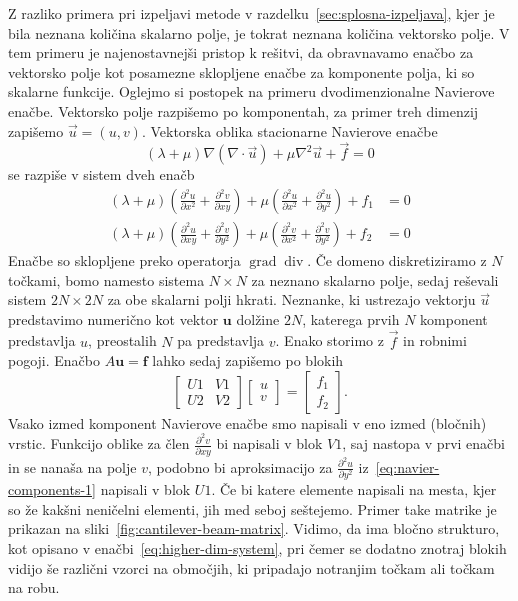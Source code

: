 \documentclass[12pt,a4paper,twoside]{article}
\theoremstyle{definition} %
\theoremstyle{plain} %
\numberwithin{equation}{section}
\renewcommand{\div}{\operatorname{div}}
\newcommand{\grad}{\operatorname{grad}}
\renewcommand{\b}{\boldsymbol}
\newcommand{\dpar}[2]{\ensuremath{\frac{\partial #1}{\partial #2}}}
\newcommand{\vu}{\vec{u}}
\newcommand{\vf}{\vec{f}}
\begin{document}
Z razliko primera pri izpeljavi metode v razdelku~\ref{sec:splosna-izpeljava}, kjer je bila neznana
količina skalarno polje, je tokrat neznana količina vektorsko polje. V tem primeru je
najenostavnejši pristop k rešitvi, da obravnavamo enačbo za vektorsko polje kot posamezne sklopljene
enačbe za komponente polja, ki so skalarne funkcije. Oglejmo si postopek na primeru dvodimenzionalne
Navierove enačbe. Vektorsko polje razpišemo po komponentah, za primer treh dimenzij zapišemo $\vu =
(u, v)$. Vektorska oblika stacionarne Navierove enačbe
\begin{equation}
  (\lambda+\mu)\nabla(\nabla\cdot \vu) + \mu\nabla^2 \vu + \vf = 0
\end{equation}
se razpiše v sistem dveh enačb
\begin{align}
  \label{eq:navier-components-1}
(\lambda +\mu ) \left(\dpar{^2u}{x^2}+\dpar{^2v}{xy}\right)+\mu  \left(\dpar{^2u}{x^2}+\dpar{^2u}{y^2}\right)+f_1&=0 \\
(\lambda +\mu ) \left(\dpar{^2u}{xy}+\dpar{^2v}{y^2}\right)+\mu  \left(\dpar{^2v}{x^2}+\dpar{^2v}{y^2}\right)+f_2&=0
\end{align}
Enačbe so sklopljene preko operatorja $\grad\div$. Če domeno diskretiziramo z $N$ točkami, bomo
namesto sistema $N\times N$ za neznano skalarno polje, sedaj reševali sistem $2N\times 2N$ za
obe skalarni polji hkrati. Neznanke, ki ustrezajo vektorju $\vu$ predstavimo numerično kot vektor
$\b{u}$ dolžine $2N$, katerega prvih $N$ komponent predstavlja $u$, preostalih $N$ pa predstavlja $v$.
Enako storimo z $\vf$ in robnimi pogoji. Enačbo $A\b u = \b f$ lahko sedaj zapišemo po blokih
\begin{equation}
  \begin{bmatrix}
    U1 & V1 \\
    U2 & V2
  \end{bmatrix}
  \begin{bmatrix}
    u \\ v
  \end{bmatrix}
  =
  \begin{bmatrix}
    f_1 \\ f_2
  \end{bmatrix}.
  \label{eq:higher-dim-system}
\end{equation}
Vsako izmed komponent Navierove enačbe smo napisali v eno izmed (bločnih) vrstic. Funkcijo
oblike za člen $\dpar{^2v}{xy}$ bi napisali v blok $V1$, saj nastopa v prvi enačbi in se nanaša na
polje $v$, podobno bi aproksimacijo za $\dpar{^2u}{y^2}$ iz~\eqref{eq:navier-components-1} napisali
v blok $U1$. Če bi katere elemente napisali na mesta, kjer so že kakšni neničelni elementi, jih med
seboj seštejemo. Primer take matrike je prikazan na sliki~\ref{fig:cantilever-beam-matrix}.
Vidimo, da ima bločno strukturo, kot opisano v enačbi~\ref{eq:higher-dim-system}, pri čemer se
dodatno znotraj blokih vidijo še različni vzorci na območjih, ki pripadajo notranjim točkam ali
točkam na robu.
\end{document}
